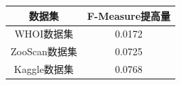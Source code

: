 \documentclass[notheorems,mathserif,table,compress]{beamer}  %
\begin{document}
\begin{frame}
\begin{columns}
\begin{column}{0.5\linewidth}
\begin{table}
\scriptsize
  \centering
  \begin{tabular}[c]{cc}
    \toprule
    数据集 & F-Measure提高量\\
    \midrule
    WHOI数据集 & 0.0172\\
    ZooScan数据集 & 0.0725\\
    Kaggle数据集 & 0.0768\\
    \bottomrule
  \end{tabular}
\end{table}
\end{column}
\end{columns}\vspace{1ex}
\end{frame}


\end{document}
